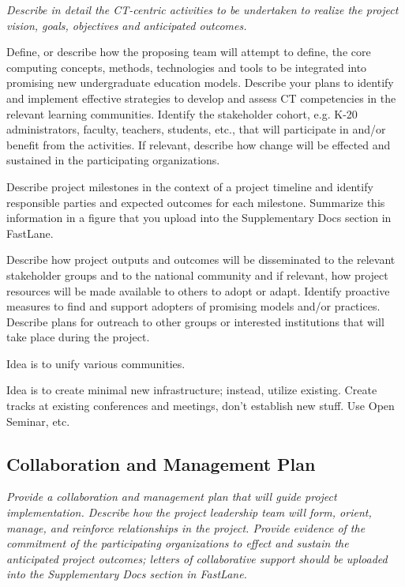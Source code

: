 {\em Describe in detail the CT-centric activities to be undertaken to realize the project vision, goals, objectives and anticipated outcomes. 

Define, or describe how the proposing team will attempt to define, the core computing concepts, methods, technologies and tools to be integrated into promising new undergraduate education models.  Describe your plans to identify and implement effective strategies to develop and assess CT competencies in the relevant learning communities.  Identify the stakeholder cohort, e.g. K-20 administrators, faculty, teachers, students, etc., that will participate in and/or benefit from the activities. If relevant, describe how change will be effected and sustained in the participating organizations.  

Describe project milestones in the context of a project timeline and identify responsible parties and expected outcomes for each milestone.  Summarize this information in a figure that you upload into the Supplementary Docs section in FastLane. 

Describe how project outputs and outcomes will be disseminated to the relevant stakeholder groups and to the national community and if relevant, how project resources will be made available to others to adopt or adapt. Identify proactive measures to find and support adopters of promising models and/or practices. Describe plans for outreach to other groups or interested institutions that will take place during the project.  
}

Idea is to unify various communities.

Idea is to create minimal new infrastructure; instead, utilize existing.  Create tracks at existing conferences and meetings, don't establish new stuff.  Use Open Seminar, etc. 


\subsection{Collaboration and Management Plan}

{\em Provide a collaboration and management plan that will guide project implementation.  Describe how the project leadership team will form, orient, manage, and reinforce relationships in the project.  Provide evidence of the commitment of the participating organizations to effect and sustain the anticipated project outcomes; letters of collaborative support should be uploaded into the Supplementary Docs section in FastLane. }

